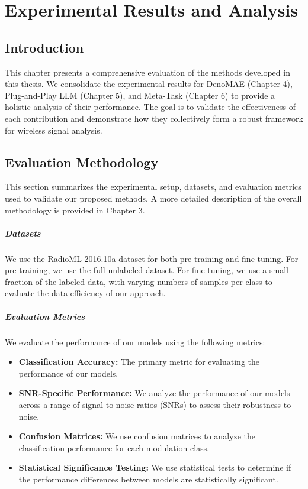 %
%

\chapter{Experimental Results and Analysis}
\label{chap:results}

\section{Introduction}
\label{res:intro}
This chapter presents a comprehensive evaluation of the methods developed in this thesis. We consolidate the experimental results for DenoMAE (Chapter 4), Plug-and-Play LLM (Chapter 5), and Meta-Task (Chapter 6) to provide a holistic analysis of their performance. The goal is to validate the effectiveness of each contribution and demonstrate how they collectively form a robust framework for wireless signal analysis.

\section{Evaluation Methodology}
\label{res:eval}
This section summarizes the experimental setup, datasets, and evaluation metrics used to validate our proposed methods. A more detailed description of the overall methodology is provided in Chapter 3.

\paragraph{Datasets}
We use the RadioML 2016.10a dataset for both pre-training and fine-tuning. For pre-training, we use the full unlabeled dataset. For fine-tuning, we use a small fraction of the labeled data, with varying numbers of samples per class to evaluate the data efficiency of our approach.

\paragraph{Evaluation Metrics}
We evaluate the performance of our models using the following metrics:
\begin{itemize}
    \item \textbf{Classification Accuracy:} The primary metric for evaluating the performance of our models.
    \item \textbf{SNR-Specific Performance:} We analyze the performance of our models across a range of signal-to-noise ratios (SNRs) to assess their robustness to noise.
    \item \textbf{Confusion Matrices:} We use confusion matrices to analyze the classification performance for each modulation class.
    \item \textbf{Statistical Significance Testing:} We use statistical tests to determine if the performance differences between models are statistically significant.
\end{itemize}

